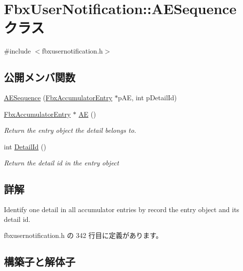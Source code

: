 \hypertarget{class_fbx_user_notification_1_1_a_e_sequence}{}\section{Fbx\+User\+Notification\+:\+:A\+E\+Sequence クラス}
\label{class_fbx_user_notification_1_1_a_e_sequence}


{\ttfamily \#include $<$fbxusernotification.\+h$>$}

\subsection*{公開メンバ関数}
\begin{DoxyCompactItemize}
\item 
\hyperlink{class_fbx_user_notification_1_1_a_e_sequence_a88b22a1de4aec9c4c51f5a09e6821160}{A\+E\+Sequence} (\hyperlink{class_fbx_accumulator_entry}{Fbx\+Accumulator\+Entry} $\ast$p\+AE, int p\+Detail\+Id)
\item 
\hyperlink{class_fbx_accumulator_entry}{Fbx\+Accumulator\+Entry} $\ast$ \hyperlink{class_fbx_user_notification_1_1_a_e_sequence_a62caeec18280c5f51f0d44b6a9cab155}{AE} ()
\begin{DoxyCompactList}\small\item\em Return the entry object the detail belongs to. \end{DoxyCompactList}\item 
int \hyperlink{class_fbx_user_notification_1_1_a_e_sequence_ad3052bbb86f4b73424e0f00a52f27218}{Detail\+Id} ()
\begin{DoxyCompactList}\small\item\em Return the detail id in the entry object \end{DoxyCompactList}\end{DoxyCompactItemize}


\subsection{詳解}
Identify one detail in all accumulator entries by record the entry object and its detail id. 

 fbxusernotification.\+h の 342 行目に定義があります。



\subsection{構築子と解体子}
\mbox{\label{class_fbx_user_notification_1_1_a_e_sequence_a88b22a1de4aec9c4c51f5a09e6821160}} 
